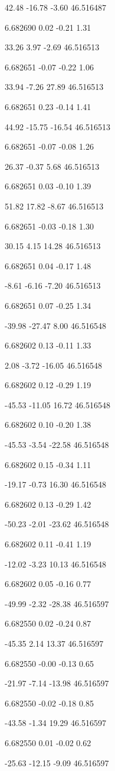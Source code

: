 42.48
-16.78
-3.60
46.516487

6.682690
0.02
-0.21
1.31

33.26
3.97
-2.69
46.516513

6.682651
-0.07
-0.22
1.06

33.94
-7.26
27.89
46.516513

6.682651
0.23
-0.14
1.41

44.92
-15.75
-16.54
46.516513

6.682651
-0.07
-0.08
1.26

26.37
-0.37
5.68
46.516513

6.682651
0.03
-0.10
1.39

51.82
17.82
-8.67
46.516513

6.682651
-0.03
-0.18
1.30

30.15
4.15
14.28
46.516513

6.682651
0.04
-0.17
1.48

-8.61
-6.16
-7.20
46.516513

6.682651
0.07
-0.25
1.34

-39.98
-27.47
8.00
46.516548

6.682602
0.13
-0.11
1.33

2.08
-3.72
-16.05
46.516548

6.682602
0.12
-0.29
1.19

-45.53
-11.05
16.72
46.516548

6.682602
0.10
-0.20
1.38

-45.53
-3.54
-22.58
46.516548

6.682602
0.15
-0.34
1.11

-19.17
-0.73
16.30
46.516548

6.682602
0.13
-0.29
1.42

-50.23
-2.01
-23.62
46.516548

6.682602
0.11
-0.41
1.19

-12.02
-3.23
10.13
46.516548

6.682602
0.05
-0.16
0.77

-49.99
-2.32
-28.38
46.516597

6.682550
0.02
-0.24
0.87

-45.35
2.14
13.37
46.516597

6.682550
-0.00
-0.13
0.65

-21.97
-7.14
-13.98
46.516597

6.682550
-0.02
-0.18
0.85

-43.58
-1.34
19.29
46.516597

6.682550
0.01
-0.02
0.62

-25.63
-12.15
-9.09
46.516597

